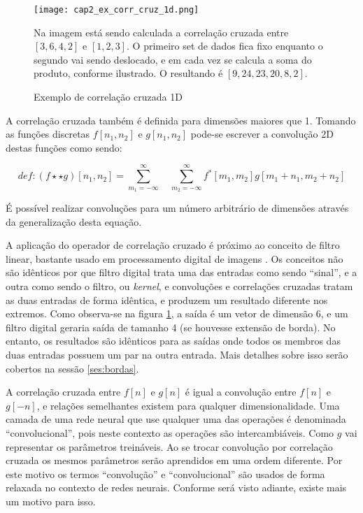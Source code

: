 \begin{figure}[!htb]
	\centering
	\texttt{[image: cap2\_ex\_corr\_cruz\_1d.png]}
	\caption{Exemplo de correlação cruzada 1D}
	\label{fig:cap2_ex_corr_cruz_1d}
	Na imagem está sendo calculada a correlação cruzada entre $[3,6,4,2]$ e
	$[1,2,3]$. O primeiro set de dados fica fixo enquanto o segundo vai sendo
	deslocado, e em cada vez se calcula a soma do produto, conforme ilustrado.
	O resultando é $[9,24,23,20,8,2]$.
\end{figure}

A correlação cruzada também é definida para dimensões maiores que 1.
Tomando as funções discretas $f[n_1,n_2]$ e $g[n_1,n_2]$ pode-se 
escrever a convolução 2D destas funções como sendo:

\begin{equation}
	def: (f \star\star g)[n_1,n_2] =
		\sum_{m_1=-\infty}^{\infty} \quad
		\sum_{m_2=-\infty}^{\infty}
		f^*[m_1,m_2]g[m_1+n_1,m_2+n_2]
\end{equation}

É possível realizar convoluções para um número arbitrário de dimensões através
da generalização desta equação.

A aplicação do operador de correlação cruzado é próximo ao conceito de filtro
linear, bastante usado em processamento digital de imagens
\cite{gonzalezwoods200708}. Os conceitos não
são idênticos por que filtro digital trata uma das entradas como sendo
``sinal'',
e a outra como sendo o filtro, ou \emph{kernel}, e convoluções e correlações
cruzadas tratam as duas entradas de forma idêntica, e produzem um resultado
diferente nos extremos. Como observa-se na figura
\ref{fig:cap2_ex_corr_cruz_1d}, a saída é um vetor de dimensão 6, e um filtro
digital geraria saída de tamanho 4 (se houvesse extensão de borda).
No entanto, os resultados são idênticos para as saídas onde todos os membros
das duas entradas possuem um par na outra entrada. Mais detalhes sobre isso
serão cobertos na sessão \ref{ses:bordas}.

A correlação cruzada entre $f[n]$ e $g[n]$
é igual a convolução entre $f[n]$ e $g[-n]$, e relações semelhantes existem
para qualquer dimensionalidade. Uma camada de uma rede
neural que use qualquer uma das operações é denominada “convolucional”,
pois neste contexto as operações são intercambiáveis. Como $g$ vai
representar os parâmetros treináveis. Ao se trocar convolução por correlação
cruzada os mesmos parâmetros serão aprendidos em uma ordem diferente.
Por este motivo os termos ``convolução'' e ``convolucional'' são usados de forma
relaxada no contexto de redes neurais. Conforme será visto adiante, existe
mais um motivo para isso.

